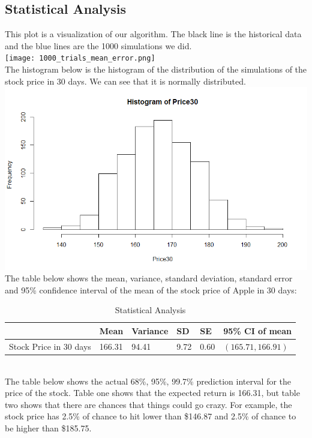 \documentclass{article}
\begin{document}
\subsection{Statistical Analysis}
This plot is a visualization of our algorithm. The black line is the historical data and the blue lines are the 1000 simulations we did. 
\\
\texttt{[image: 1000\_trials\_mean\_error.png]}
\\
The histogram below is the histogram of the distribution of the simulations of the stock price in 30 days. We can see that it is normally distributed. \\
\includegraphics[width = \textwidth]{Rplot.png}\\
The table below shows the mean, variance, standard deviation, standard error and 95\% confidence interval of the mean of the stock price of Apple in 30 days: \\
\begin{table}[hbt]
  \centering
  \caption{Statistical Analysis}
  \label{stat}
  \begin{tabular}{|l|l|l|l|l|l|}
  \hline
  \multicolumn{1}{|c|}{} & Mean   & Variance & SD & SE & 95\% CI of mean\\ \hline
  Stock Price in 30 days & 166.31 & 94.41    & 9.72               & 0.60           & $\left(165.71, 166.91\right) $      \\ \hline
  \end{tabular}
\end{table}
\\
The table below shows the actual 68\%, 95\%, 99.7\% prediction interval for the price of the stock. Table one shows that the expected return is 166.31, but table two shows that there are chances that things could go crazy. For example, the stock price has 2.5\% of chance to hit lower than \$146.87 and 2.5\% of chance to be higher than \$185.75. 
\end{document}
